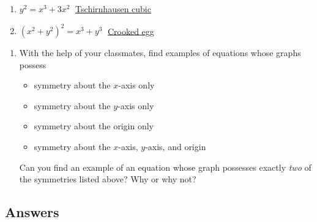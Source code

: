 \begin{multicols}{2}
\begin{enumerate}
\setcounter{enumi}{\value{HW}}


\item $y^{2} = x^{3} + 3x^{2}\;$ \href{http://en.wikipedia.org/wiki/Tschirnhausen_cubic}{\underline{Tschirnhausen cubic}}
\item \label{listofcurveslast} $(x^{2} + y^{2})^{2} = x^{3} + y^{3}\;$ \href{http://en.wikipedia.org/wiki/Crooked_egg_curve}{\underline{Crooked egg}} 

\setcounter{HW}{\value{enumi}}
\end{enumerate}
\end{multicols}

\begin{enumerate}
\setcounter{enumi}{\value{HW}}

\item  With the help of your classmates, find examples of equations whose graphs possess 

\begin{itemize}

\item  symmetry about the $x$-axis only

\item  symmetry about the $y$-axis only

\item  symmetry about the origin only

\item  symmetry about the $x$-axis, $y$-axis, and origin

\end{itemize}

Can you find an example of an equation whose graph possesses exactly \textit{two} of the symmetries listed above?  Why or why not?

\end{enumerate}

\newpage

\subsection{Answers}


